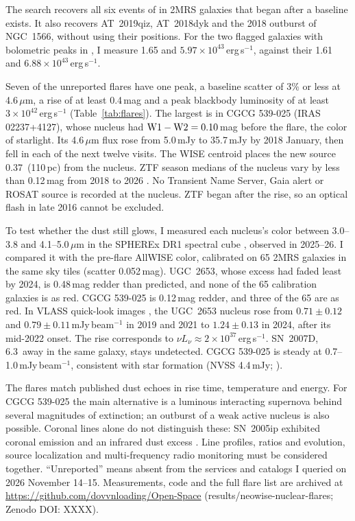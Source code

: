 \documentclass{aastex701}
\begin{document}
The search recovers all six events of \citet{2024ApJ...961..211M} in 2MRS galaxies that began after a baseline exists. It also recovers AT~2019qiz, AT~2018dyk and the 2018 outburst of NGC~1566, without using their positions. For the two flagged galaxies with bolometric peaks in \citet{2025A&A...695A.228N}, I measure 1.65 and $5.97\times10^{43}$\,erg\,s$^{-1}$, against their 1.61 and $6.88\times10^{43}$\,erg\,s$^{-1}$.

Seven of the unreported flares have one peak, a baseline scatter of 3\% or less at 4.6\,$\mu$m, a rise of at least 0.4\,mag and a peak blackbody luminosity of at least $3\times10^{42}$\,erg\,s$^{-1}$ (Table~\ref{tab:flares}). The largest is in CGCG 539-025 (IRAS 02237+4127), whose nucleus had ${\rm W1}-{\rm W2}=0.10$\,mag before the flare, the color of starlight. Its 4.6\,$\mu$m flux rose from 5.0\,mJy to 35.7\,mJy by 2018 January, then fell in each of the next twelve visits. The WISE centroid places the new source 0.37\arcsec\ (110\,pc) from the nucleus. ZTF season medians of the nucleus vary by less than 0.12\,mag from 2018 to 2026 \citep{2019PASP..131a8002B}. No Transient Name Server, Gaia alert \citep{2021A&A...652A..76H} or ROSAT \citep{2016A&A...588A.103B} source is recorded at the nucleus. ZTF began after the rise, so an optical flash in late 2016 cannot be excluded.

To test whether the dust still glows, I measured each nucleus's color between 3.0--3.8 and 4.1--5.0\,$\mu$m in the SPHEREx DR1 spectral cube \citep{2014arXiv1412.4872D}, observed in 2025--26. I compared it with the pre-flare AllWISE color, calibrated on 65 2MRS galaxies in the same sky tiles (scatter 0.052\,mag). UGC~2653, whose excess had faded least by 2024, is 0.48\,mag redder than predicted, and none of the 65 calibration galaxies is as red. CGCG 539-025 is 0.12\,mag redder, and three of the 65 are as red. In VLASS quick-look images \citep{2020PASP..132c5001L}, the UGC~2653 nucleus rose from $0.71\pm0.12$ and $0.79\pm0.11$\,mJy\,beam$^{-1}$ in 2019 and 2021 to $1.24\pm0.13$ in 2024, after its mid-2022 onset. The rise corresponds to $\nu L_\nu\approx2\times10^{37}$\,erg\,s$^{-1}$. SN~2007D, 6.3\arcsec\ away in the same galaxy, stays undetected. CGCG 539-025 is steady at 0.7--1.0\,mJy\,beam$^{-1}$, consistent with star formation (NVSS 4.4\,mJy; \citealt{1998AJ....115.1693C}).

The flares match published dust echoes in rise time, temperature and energy. For CGCG 539-025 the main alternative is a luminous interacting supernova behind several magnitudes of extinction; an outburst of a weak active nucleus is also possible. Coronal lines alone do not distinguish these: SN~2005ip exhibited coronal emission and an infrared dust excess \citep{2009ApJ...695.1334S}. Line profiles, ratios and evolution, source localization and multi-frequency radio monitoring must be considered together. ``Unreported'' means absent from the services and catalogs I queried on 2026 November 14--15. Measurements, code and the full flare list are archived at \url{https://github.com/dovvnloading/Open-Space} (results/neowise-nuclear-flares; Zenodo DOI: XXXX).
\end{document}
